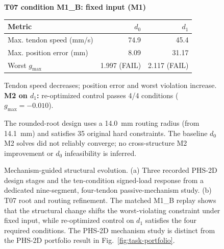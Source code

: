 \begin{figure}[t]
\begin{minipage}[t]{0.18\textwidth}
\end{minipage}\hfill
\begin{minipage}[t]{0.36\textwidth}
\scriptsize
\textbf{T07 condition M1\_B: fixed input (M1)}
\begin{tabularx}{\linewidth}{@{}Xrr@{}}
\toprule
\textbf{Metric} & \textbf{$d_0$} & \textbf{$d_1$}\\
\midrule
Max. tendon speed (mm/s) & 74.9 & 45.4\\
Max. position error (mm) & 8.09 & 31.17\\
Worst $g_{\max}$ & 1.997 (FAIL) & 2.117 (FAIL)\\
\bottomrule
\end{tabularx}
\textcolor{TraceTeal}{Tendon speed decreases}; position error and worst violation increase.\\[2pt]
\textbf{M2 on $d_1$:} re-optimized control passes 4/4 conditions ($g_{\max}=-0.010$).
\end{minipage}
\par\vspace{3pt}
\noindent\scriptsize
The rounded-root design uses a 14.0~mm routing radius (from 14.1~mm) and satisfies 35 original hard constraints. The baseline $d_0$ M2 solves did not reliably converge; no cross-structure M2 improvement or $d_0$ infeasibility is inferred.
\caption{Mechanism-guided structural evolution. (a) Three recorded PHS-2D design stages and the ten-condition signed-load response from a dedicated nine-segment, four-tendon passive-mechanism study. (b) T07 root and routing refinement. The matched M1\_B replay shows that the structural change shifts the worst-violating constraint under fixed input, while re-optimized control on $d_1$ satisfies the four required conditions. The PHS-2D mechanism study is distinct from the PHS-2D portfolio result in Fig.~\ref{fig:task-portfolio}.}
\label{fig:structure-evolution}
\end{figure}